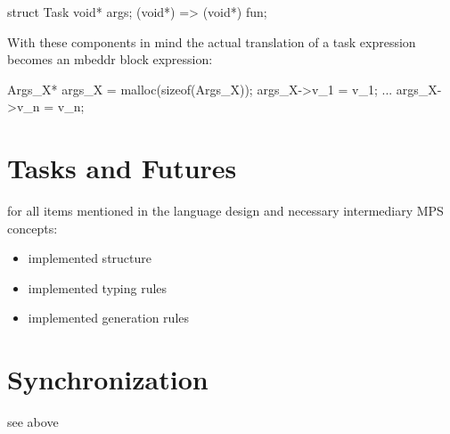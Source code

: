 struct Task {
  void* args;
  (void*) => (void*) fun;
}

With these components in mind the actual translation of a task expression becomes an mbeddr block expression:

{
  Args\_X* args\_X = malloc(sizeof(Args\_X));
  args\_X->v\_1 = v\_1;
  ...
  args\_X->v\_n = v\_n;
}













\section{Tasks and Futures}
for all items mentioned in the language design and necessary intermediary MPS concepts:
\begin{itemize}
\item implemented structure
\item implemented typing rules
\item implemented generation rules
\end{itemize}
\section{Synchronization}
see above

